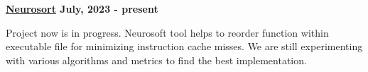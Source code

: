 \textbf{\href{https://github.com/jirol9xa/neurosort} {Neurosort} \hfill  July, 2023 - present} \par
\begin{itemize}
Project now is in progress. Neurosoft tool helps to reorder function within executable file for minimizing instruction cache misses. We are still experimenting with various algorithms and metrics to find the best implementation.
\end{itemize} \par